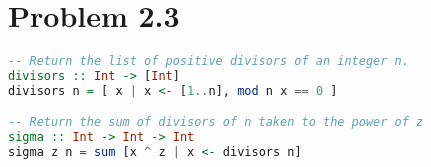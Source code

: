 \documentclass{article}
\begin{document}
\vspace{3cm}
\section*{Problem 2.3}
\begin{lstlisting}[language=Haskell, caption=Haskell code of divisor and sigma functions]
-- Return the list of positive divisors of an integer n.
divisors :: Int -> [Int]
divisors n = [ x | x <- [1..n], mod n x == 0 ]

-- Return the sum of divisors of n taken to the power of z
sigma :: Int -> Int -> Int
sigma z n = sum [x ^ z | x <- divisors n]
\end{lstlisting}
\end{document}
